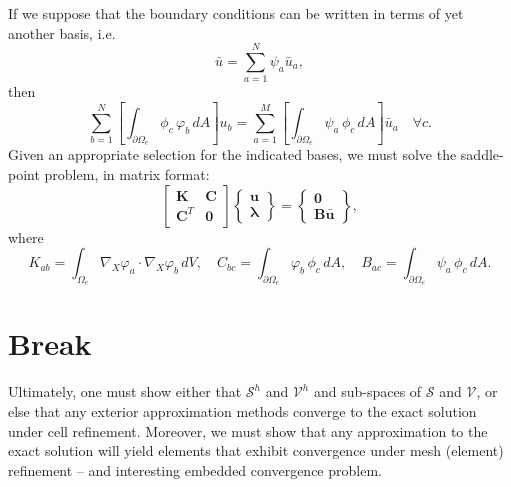 If we suppose that the boundary conditions can be written in terms of yet another basis, i.e.
\begin{equation}
	\bar{u} = \sum_{a=1}^N \psi_a \bar{u}_a,
\end{equation}
then
\begin{equation}
	\sum_{b=1}^N \left[ \int_{\partial \Omega_e} \phi_c \, \varphi_b \, dA \right] u_b = \sum_{a=1}^M \left[ \int_{\partial \Omega_e} \psi_a \, \phi_c \, dA \right] \bar{u}_a \quad \forall c.
\end{equation}
Given an appropriate selection for the indicated bases, we must solve the saddle-point problem, in matrix format:
\begin{equation}
	\left[ \begin{array}{cc} \mathbf{K} & \mathbf{C} \\ \mathbf{C}^T & \mathbf{0} \end{array} \right] \left\{ \begin{array}{c} \mathbf{u} \\ \boldsymbol{\lambda} \end{array} \right\} = \left\{ \begin{array}{c} \mathbf{0} \\ \mathbf{B} \bar{\mathbf{u}} \end{array} \right\},
\end{equation}
where
\begin{equation}
	K_{ab} = \int_{\Omega_e} \nabla_X \varphi_a \cdot \nabla_X \varphi_b \, dV, \quad C_{bc} = \int_{\partial \Omega_e} \varphi_b \, \phi_c \, dA, \quad B_{ac} = \int_{\partial \Omega_e} \psi_a \, \phi_c \, dA.
\end{equation}
	
\section{Break}
	
	Ultimately, one must show either that $\mathcal{S}^h$ and $\mathcal{V}^h$ and sub-spaces of $\mathcal{S}$ and $\mathcal{V}$, or else that any exterior approximation methods converge to the exact solution under cell refinement. Moreover, we must show that any approximation to the exact solution will yield elements that exhibit convergence under mesh (element) refinement -- and interesting embedded convergence problem.
		
			

